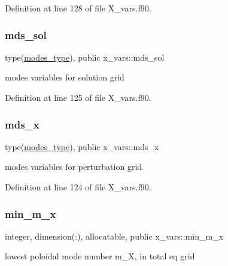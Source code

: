 Definition at line 128 of file X\+\_\+vars.\+f90.

\mbox{\label{namespacex__vars_ac74f59668de6caca7038decc7191c6a1}} 
\subsubsection{\texorpdfstring{mds\+\_\+sol}{mds\_sol}}
{\footnotesize\ttfamily type(\hyperlink{structx__vars_1_1modes__type}{modes\+\_\+type}), public x\+\_\+vars\+::mds\+\_\+sol}



modes variables for solution grid 



Definition at line 125 of file X\+\_\+vars.\+f90.

\mbox{\label{namespacex__vars_a690d4228d2a81ec5a7a6cd13be3a56a1}} 
\subsubsection{\texorpdfstring{mds\+\_\+x}{mds\_x}}
{\footnotesize\ttfamily type(\hyperlink{structx__vars_1_1modes__type}{modes\+\_\+type}), public x\+\_\+vars\+::mds\+\_\+x}



modes variables for perturbation grid 



Definition at line 124 of file X\+\_\+vars.\+f90.

\mbox{\label{namespacex__vars_aae62c7b4f8043dcccad97454b5857690}} 
\subsubsection{\texorpdfstring{min\+\_\+m\+\_\+x}{min\_m\_x}}
{\footnotesize\ttfamily integer, dimension(\+:), allocatable, public x\+\_\+vars\+::min\+\_\+m\+\_\+x}



lowest poloidal mode number {\ttfamily m\+\_\+X}, in total eq grid 



